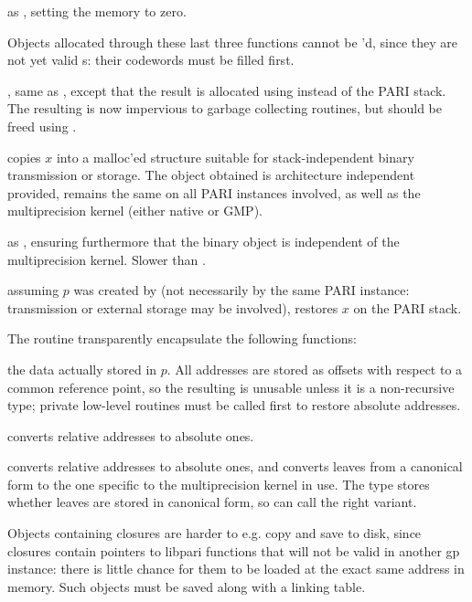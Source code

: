  as , setting the memory
to zero.

\noindent Objects allocated through these last three functions cannot be
'd, since they are not yet valid s: their codewords
must be filled first.

, same as , except
that the result is allocated using  instead of the PARI
stack. The resulting  is now impervious to garbage collecting
routines, but should be freed using .


 copies $x$ into a malloc'ed structure suitable
for stack-independent binary transmission or storage. The object obtained
is architecture independent provided,  remains the same
on all PARI instances involved, as well as the multiprecision kernel (either
native or GMP).

 as , ensuring furthermore
that the binary object is independent of the multiprecision kernel. Slower
than .

 assuming $p$ was created by 
(not necessarily by the same PARI instance: transmission or external storage
may be involved), restores $x$ on the PARI stack.

\noindent The routine  transparently encapsulate the following
functions:

 the  data actually stored in $p$.
All addresses are stored as offsets with respect to a common reference point,
so the resulting  is unusable unless it is a non-recursive type;
private low-level routines must be called first to restore absolute addresses.

 converts relative addresses to
absolute ones.

 converts relative addresses to
absolute ones, and converts leaves from a canonical form to the one
specific to the multiprecision kernel in use. The  type stores
whether leaves are stored in canonical form, so  can call
the right variant.

\noindent Objects containing closures are harder to e.g. copy and save to disk,
since closures contain pointers to libpari functions that will not be valid in
another gp instance: there is little chance for them to be loaded at the exact
same address in memory. Such objects must be saved along with a linking table.

